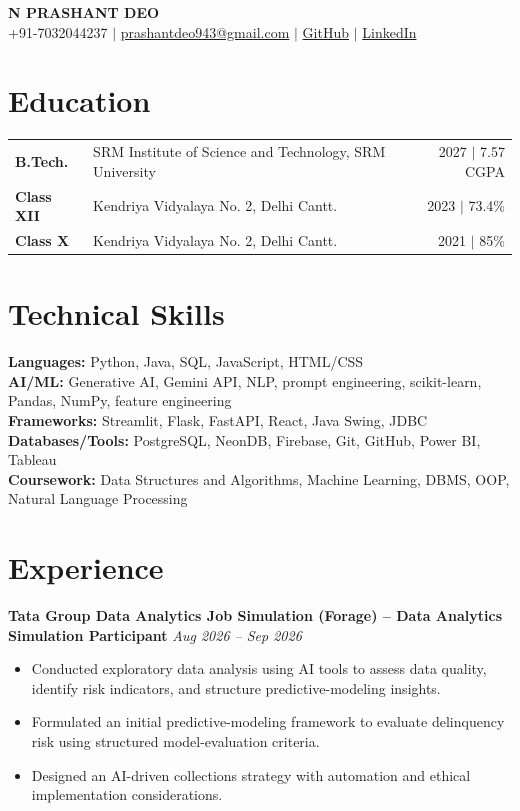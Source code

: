 \documentclass[10pt,a4paper]{article}
\newcommand{\role}[2]{\textbf{#1} \hfill \textit{#2}\\[-1pt]}
\begin{document}
\begin{center}
    {\LARGE\bfseries N PRASHANT DEO}\\[3pt]
    +91-7032044237 $\mid$ \href{mailto:prashantdeo943@gmail.com}{prashantdeo943@gmail.com} $\mid$
    \href{https://github.com/p11079}{GitHub} $\mid$
    \href{https://www.linkedin.com/in/n-prashant-deo/}{LinkedIn}
\end{center}

\section*{Education}
\begin{tabularx}{\linewidth}{@{}>{\bfseries}l X r@{}}
  B.Tech. & SRM Institute of Science and Technology, SRM University & 2027 $\mid$ 7.57 CGPA\\
  Class XII & Kendriya Vidyalaya No. 2, Delhi Cantt. & 2023 $\mid$ 73.4\%\\
  Class X & Kendriya Vidyalaya No. 2, Delhi Cantt. & 2021 $\mid$ 85\%
\end{tabularx}

\section*{Technical Skills}
\textbf{Languages:} Python, Java, SQL, JavaScript, HTML/CSS\\
\textbf{AI/ML:} Generative AI, Gemini API, NLP, prompt engineering, scikit-learn, Pandas, NumPy, feature engineering\\
\textbf{Frameworks:} Streamlit, Flask, FastAPI, React, Java Swing, JDBC\\
\textbf{Databases/Tools:} PostgreSQL, NeonDB, Firebase, Git, GitHub, Power BI, Tableau\\
\textbf{Coursework:} Data Structures and Algorithms, Machine Learning, DBMS, OOP, Natural Language Processing

\section*{Experience}
\role{Tata Group Data Analytics Job Simulation (Forage) -- Data Analytics Simulation Participant}{Aug 2026 -- Sep 2026}
\begin{itemize}
    \item Conducted exploratory data analysis using AI tools to assess data quality, identify risk indicators, and structure predictive-modeling insights.
    \item Formulated an initial predictive-modeling framework to evaluate delinquency risk using structured model-evaluation criteria.
    \item Designed an AI-driven collections strategy with automation and ethical implementation considerations.
\end{itemize}
\end{document}
